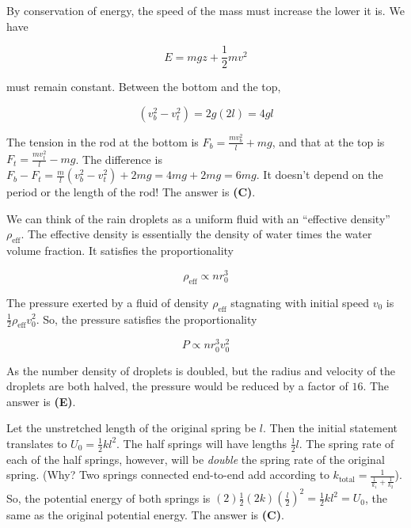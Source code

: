 \documentclass[12pt]{article}
\begin{document}
\vspace{2 \baselineskip}



By conservation of energy, the speed of the mass must increase the lower it is. We have

$$E = m g z + \frac{1}{2} m v^2$$

must remain constant. Between the bottom and the top,

$$(v_b^2 - v_t^2) = 2 g (2 l) = 4 g l$$

The tension in the rod at the bottom is $F_b = \frac{m v_b^2}{l} + m g$, and that at the top is $F_t = \frac{m v_t^2}{l} - m g$. The difference is $F_b - F_t = \frac{m}{l} (v_b^2 - v_t^2) + 2 m g = 4 m g + 2 m g = 6 m g$. It doesn't depend on the period or the length of the rod! The answer is \textbf{(C)}.


\vspace{2 \baselineskip}



We can think of the rain droplets as a uniform fluid with an ``effective density'' $\rho_\text{eff}$. The effective density is essentially the density of water times the water volume fraction. It satisfies the proportionality

$$\rho_\text{eff} \propto n r_0^3$$

The pressure exerted by a fluid of density $\rho_\text{eff}$ stagnating with initial speed $v_0$ is $\frac{1}{2} \rho_\text{eff} v_0^2$. So, the pressure satisfies the proportionality

$$P \propto n r_0^3 v_0^2$$

As the number density of droplets is doubled, but the radius and velocity of the droplets are both halved, the pressure would be reduced by a factor of $16$. The answer is \textbf{(E)}.


\vspace{2 \baselineskip}



Let the unstretched length of the original spring be $l$. Then the initial statement translates to $U_0 = \frac{1}{2} k l^2$. The half springs will have lengths $\frac{1}{2} l$. The spring rate of each of the half springs, however, will be \textit{double} the spring rate of the original spring. (Why? Two springs connected end-to-end add according to $k_\text{total} = \frac{1}{\frac{1}{k_1} + \frac{1}{k_2}}$). So, the potential energy of both springs is $(2) \frac{1}{2} (2 k) \left( \frac{l}{2} \right)^2 = \frac{1}{2} k l^2 = U_0$, the same as the original potential energy. The answer is \textbf{(C)}.
\end{document}
